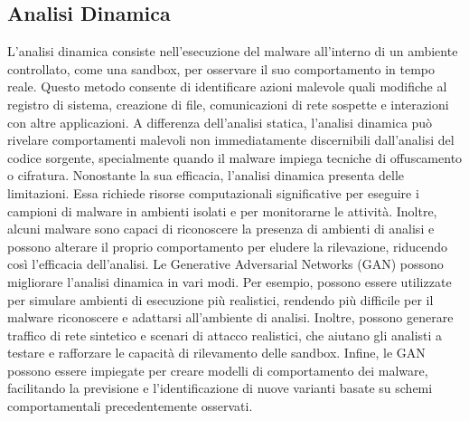 \subsection{Analisi Dinamica}
L'analisi dinamica consiste nell'esecuzione del malware all'interno di un ambiente controllato, come una sandbox, per osservare il suo comportamento in tempo reale. Questo metodo consente di identificare azioni malevole quali modifiche al registro di sistema, creazione di file, comunicazioni di rete sospette e interazioni con altre applicazioni. A differenza dell'analisi statica, l'analisi dinamica può rivelare comportamenti malevoli non immediatamente discernibili dall'analisi del codice sorgente, specialmente quando il malware impiega tecniche di offuscamento o cifratura.
Nonostante la sua efficacia, l'analisi dinamica presenta delle limitazioni. Essa richiede risorse computazionali significative per eseguire i campioni di malware in ambienti isolati e per monitorarne le attività. Inoltre, alcuni malware sono capaci di riconoscere la presenza di ambienti di analisi e possono alterare il proprio comportamento per eludere la rilevazione, riducendo così l'efficacia dell'analisi.
Le Generative Adversarial Networks (GAN) possono migliorare l'analisi dinamica in vari modi. Per esempio, possono essere utilizzate per simulare ambienti di esecuzione più realistici, rendendo più difficile per il malware riconoscere e adattarsi all'ambiente di analisi. Inoltre, possono generare traffico di rete sintetico e scenari di attacco realistici, che aiutano gli analisti a testare e rafforzare le capacità di rilevamento delle sandbox. Infine, le GAN possono essere impiegate per creare modelli di comportamento dei malware, facilitando la previsione e l'identificazione di nuove varianti basate su schemi comportamentali precedentemente osservati.

